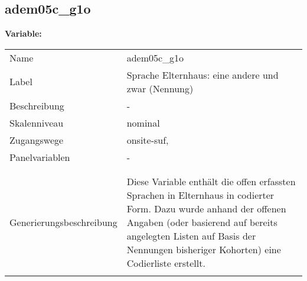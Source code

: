 	
	
	\subsection{adem05c\_g1o}
	\label{subSection:adem05c_g1o}

	\noindent\textbf{Variable:}\\
		\begin{tabular}{lL{11.3cm}}
			\label{tableVariable:adem05c_g1o}
			Name & adem05c\_g1o \\
			Label & Sprache Elternhaus: eine andere und zwar (Nennung) \\
			Beschreibung & - \\
			Skalenniveau & nominal \\
			Zugangswege &
				onsite-suf,
 \\
			Panelvariablen & -
			 \\
			 \\
 \\
					Generierungsbeschreibung & Diese Variable enthält die offen erfassten Sprachen in Elternhaus in codierter Form. Dazu wurde anhand der offenen Angaben (oder basierend auf bereits angelegten Listen auf Basis der Nennungen bisheriger Kohorten) eine Codierliste erstellt.
				 \\	
			 \\
		\end{tabular}







